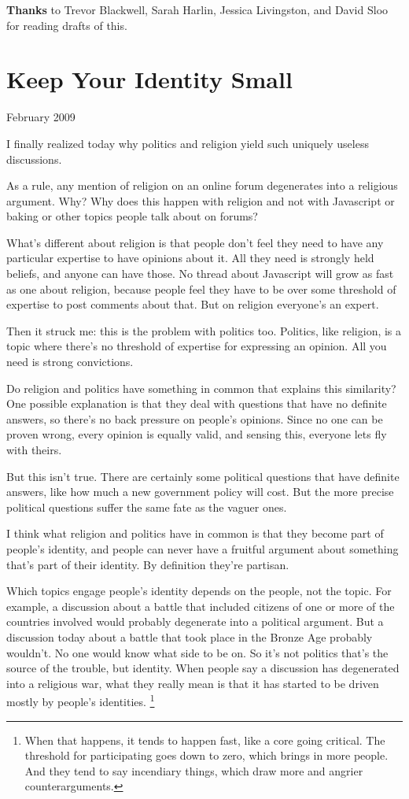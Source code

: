 \documentclass[12pt]{book}
\begin{document}
\textbf{Thanks} to Trevor Blackwell, Sarah Harlin, Jessica Livingston,
and David Sloo for reading drafts of this.
\chapter{Keep Your Identity Small  }

February 2009

I finally realized today why politics and religion yield such uniquely
useless discussions.

As a rule, any mention of religion on an online forum degenerates into a
religious argument. Why? Why does this happen with religion and not with
Javascript or baking or other topics people talk about on forums?

What's different about religion is that people don't feel they need to
have any particular expertise to have opinions about it. All they need
is strongly held beliefs, and anyone can have those. No thread about
Javascript will grow as fast as one about religion, because people feel
they have to be over some threshold of expertise to post comments about
that. But on religion everyone's an expert.

Then it struck me: this is the problem with politics too. Politics, like
religion, is a topic where there's no threshold of expertise for
expressing an opinion. All you need is strong convictions.

Do religion and politics have something in common that explains this
similarity? One possible explanation is that they deal with questions
that have no definite answers, so there's no back pressure on people's
opinions. Since no one can be proven wrong, every opinion is equally
valid, and sensing this, everyone lets fly with theirs.

But this isn't true. There are certainly some political questions that
have definite answers, like how much a new government policy will cost.
But the more precise political questions suffer the same fate as the
vaguer ones.

I think what religion and politics have in common is that they become
part of people's identity, and people can never have a fruitful argument
about something that's part of their identity. By definition they're
partisan.

Which topics engage people's identity depends on the people, not the
topic. For example, a discussion about a battle that included citizens
of one or more of the countries involved would probably degenerate into
a political argument. But a discussion today about a battle that took
place in the Bronze Age probably wouldn't. No one would know what side
to be on. So it's not politics that's the source of the trouble, but
identity. When people say a discussion has degenerated into a religious
war, what they really mean is that it has started to be driven mostly by
people's identities. \footnote{When that happens, it tends to happen fast, like a core going
critical. The threshold for participating goes down to zero, which
brings in more people. And they tend to say incendiary things, which
draw more and angrier counterarguments.}
\end{document}
